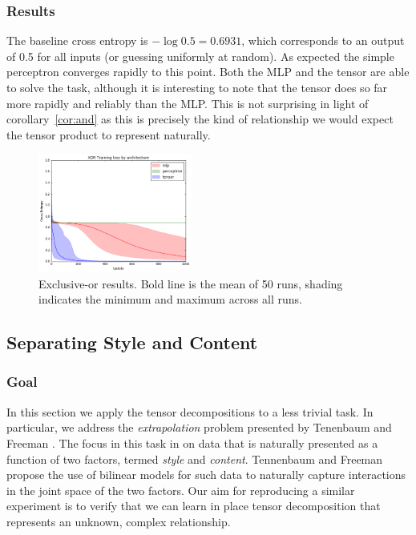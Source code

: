 \subsubsection{Results}
The baseline cross entropy is \(-\log0.5 = 0.6931\), which corresponds to an output of
0.5 for all inputs (or guessing uniformly at random). 
As expected the simple perceptron
converges rapidly to this point. Both the MLP and the tensor are able to solve the task,
although it is interesting to note that the
tensor does so far more rapidly and reliably than the MLP. This is not surprising in light of
corollary~\ref{cor:and} as this is precisely the kind of relationship we would expect the tensor
product to represent naturally.

\begin{figure}
\centering
\includegraphics[width=0.45\textwidth]{tensors/xor}
 \caption[XOR results]{Exclusive-or results. Bold line is the mean of 50 runs, shading indicates the
minimum and maximum across all runs.}
\end{figure}

\subsection{Separating Style and Content}
\subsubsection{Goal}
In this section we apply the tensor decompositions to a less trivial task. In particular, we
address the \textit{extrapolation} problem presented by Tenenbaum and 
Freeman \autocite{Tenenbaum2000}. The focus in this task in on data that is naturally presented as a
function of two factors, termed \emph{style} and \emph{content}. Tennenbaum and Freeman
propose the use of bilinear models for such data to naturally capture 
interactions in the joint space of the two
factors. Our aim for reproducing a similar experiment is to verify that we
can learn in place tensor decomposition that represents an unknown, complex relationship.

